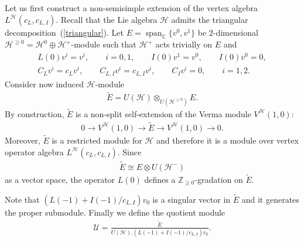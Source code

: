 \documentclass[11pt]{article}
\numberwithin{equation}{section}
\newcommand{\Z}{\mathbb Z}
\newcommand{\C}{\mathbb C}
\newcommand{\HVir}{\mathcal H}
\begin{document}
Let us f\/irst construct a non-semisimple extension of the vertex algebra $L^{\HVir} (c_L, c_{L,I})$. Recall that the Lie algebra $\HVir$ admits the triangular decomposition~(\ref{triangular}). Let $E=\operatorname{span}_{\C} \{ v^{0}, v^{1} \}$ be $2$-dimensional $\HVir^{\ge 0} = \HVir^{0} \oplus \HVir^{+}$-module such that $\HVir ^+ $ acts trivially on $E$ and
\begin{gather*}
L(0) v^{i} = v^{i} , \qquad i=0,1, \qquad I(0) v^1 = v^0, \qquad I(0) v^0 = 0, \\
C_L v^{i} = c_L v^{i}, \qquad C_{L,I} v^{i} = c_{L,I} v^{i}, \qquad C_I v^{i} = 0, \qquad i=1,2.
\end{gather*}
Consider now induced $\HVir$-module
\begin{gather*}
\widetilde E = U(\HVir) \otimes _{U (\HVir ^{\ge 0} )} E.
\end{gather*}
By construction, $\widetilde E$ is a non-split self-extension of the Verma module $V^{\HVir} (1,0)$:
\begin{gather*}
0 \rightarrow V^{\HVir} (1,0) \rightarrow \widetilde E \rightarrow V^{\HVir} (1,0 ) \rightarrow 0.
\end{gather*}
Moreover, $\widetilde E$ is a restricted module for $\HVir$ and therefore it is a module over vertex operator algebra $L^{\HVir} (c_L, c_{L,I})$. Since
\begin{gather*}
\widetilde E \cong E \otimes U(\HVir^{-})
\end{gather*}
as a vector space, the operator $L(0)$ def\/ines a $\Z_{\ge 0}$-gradation on $\widetilde E$.

Note that $ (L(-1) + I(-1) / c_{L,I} ) v_0$ is a singular vector in $\widetilde E$ and it generates the proper submodule. Finally we def\/ine the quotient module
\begin{gather*}
\mathcal U = \frac{ \widetilde E} {U(\HVir) . (L(-1) + I(-1) / c_{L,I} ) v_0}.
\end{gather*}
\end{document}
